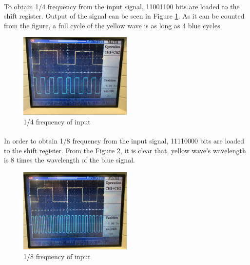 \documentclass[pdftex,12pt,a4paper]{article}
\begin{document}
\begin{flushleft}
\paragraph{}
To obtain 1/4 frequency from the input signal, 11001100 bits are loaded to the shift register. Output of the signal can be seen in Figure \ref{fig:1over4}. As it can be counted from the figure, a full cycle of the yellow wave is as long as 4 blue cycles.
\begin{figure}[h]
	\centering
	\includegraphics[width=0.5\textwidth]{1over4.jpg}	
	\caption{1/4 frequency of input}
	\label{fig:1over4}
\end{figure}

\paragraph{}
In order to obtain 1/8 frequency from the input signal, 11110000 bits are loaded to the shift register. From the Figure \ref{fig:1over8}, it is clear that, yellow wave's wavelength is 8 times the wavelength of the blue signal.
\begin{figure}[h]
	\centering
	\includegraphics[width=0.5\textwidth]{1over8.jpg}	
	\caption{1/8 frequency of input}
	\label{fig:1over8}
\end{figure}

\newpage

\end{flushleft}
\end{document}
